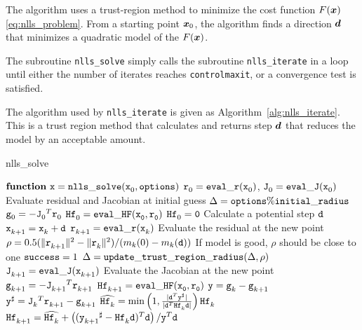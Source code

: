 
The algorithm uses a trust-region method to minimize the cost function
$F(\vx)$ \ref{eq:nlls_problem}.  From a starting point $\vx_0$, the algorithm finds a direction $\vd$ that minimizes a quadratic model of the $F(\vx)$.

The subroutine \texttt{nlls\_solve} simply calls the subroutine 
\texttt{nlls\_iterate} in a loop until either the number of iterates reaches 
\texttt{control\ct maxit}, or a convergence test is satisfied.

The algorithm used by \texttt{nlls\_iterate} is given as Algorithm~\ref{alg:nlls_iterate}.
This is a trust region method that calculates and returns step $\vd$ that 
reduces the model by an acceptable amount.  

\begin{algorithm}
\caption{nlls\_solve}
\label{alg:nlls_solve}
  \begin{algorithmic}
    \State $ {\tt {\bf function} \  \tx = nlls\_solve}(\iter[0]{\tx},{\tt options})$
    \State $\iter[0]{\tr} = {\tt eval\_r}(\iter[0]{\tx})$, $\iter[0]{\tJ} = {\tt eval\_J}(\iter[0]{\tx})$
    \Comment Evaluate residual and Jacobian at initial guess
    \State $\Delta = {\tt options\ct initial\_radius}$
    \State $ \iter[0]{\tg} = - {\iter[0]{\tJ}}^T\iter[0]{\tr}$
        \State $\iter[0]{\thess} = {\tt eval\_HF(\iter[0]{\tx},\iter[0]{\tr})}$
      \Else
        \State $\iter[0]{\thess} = {\tt 0}$
      \EndIf
    \EndIf
        \State Calculate a potential step $\td$
        \State $\iter[k+1]{\tx} = \iter[k]{\tx} + \td$
        \State $\iter[k+1]{\tr} = {\tt eval\_r}(\iter[k]{\tx})$
        \Comment Evaluate the residual at the new point
        \State $\rho = 0.5 (\| \iter[k+1]{\tr} \|^2 - \| \iter[k]{\tr}\|^2)/(m_k(0) - m_k(\td)) $ 
        \Comment If model is good, $\rho$ should be close to one
          \State ${\tt success} = 1$
        \EndIf
        \State $\Delta = {\tt update\_trust\_region\_radius}(\Delta,\rho)$
      \EndWhile
      \State $\iter[k+1]{\tJ} = {\tt eval\_J}(\iter[k+1]{\tx})$
      \Comment Evaluate the Jacobian at the new point
      \State $\iter[k+1]{\tg} = -{\iter[k+1]{\tJ}}^T\iter[k+1]{\tr}$
      \EndIf
        \State $\iter[k+1]{\thess} = {\tt eval\_HF(\iter[0]{\tx},\iter[0]{\tr})}$
      \Else
        \State $\ty = \iter[k]{\tg} - \iter[k+1]{\tg}$
        \State $\ty^\sharp = {\iter[k]{\tJ}}^T \iter[k+1]{\tr} - \iter[k+1]{\tg}$
        \State $\widehat{\iter[k]{\thess}} = \min\left( 1, \frac{|\td^T\ty^\sharp|}{|\td^T\iter[k]{\thess}\td|}\right) \iter[k]{\thess}$
        \State $\iter[k+1]{\thess} = \widehat{\iter[k]{\thess}} + 
        \left(({\iter[k+1]{\ty}}^\sharp - \iter[k]{\thess}\td 
          )^T\td\right)/\ty^T\td$
      \EndIf
    \EndIf
    \EndFor
  \end{algorithmic}
  

\end{algorithm}
